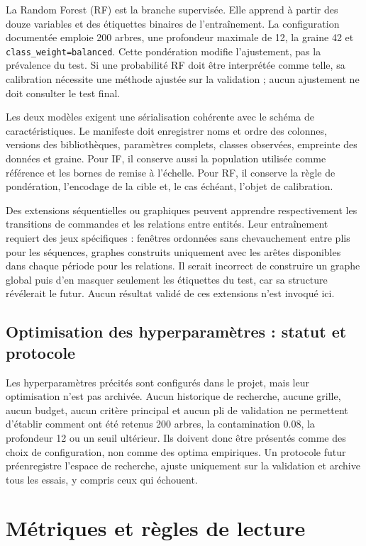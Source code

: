 \documentclass[11pt,a4paper,oneside]{report}
\theoremstyle{definition}
\theoremstyle{plain}
\begin{document}
La Random Forest (RF) est la branche supervisée. Elle apprend à partir des
douze variables et des étiquettes binaires de l'entraînement. La configuration
documentée emploie 200 arbres, une profondeur maximale de 12, la graine 42 et
\texttt{class\_weight=balanced}. Cette pondération modifie l'ajustement, pas la
prévalence du test. Si une probabilité RF doit être interprétée comme telle, sa
calibration nécessite une méthode ajustée sur la validation ; aucun ajustement
ne doit consulter le test final.

Les deux modèles exigent une sérialisation cohérente avec le schéma de
caractéristiques. Le manifeste doit enregistrer noms et ordre des colonnes,
versions des bibliothèques, paramètres complets, classes observées, empreinte
des données et graine. Pour IF, il conserve aussi la population utilisée comme
référence et les bornes de remise à l'échelle. Pour RF, il conserve la règle de
pondération, l'encodage de la cible et, le cas échéant, l'objet de calibration.

Des extensions séquentielles ou graphiques peuvent apprendre respectivement les
transitions de commandes et les relations entre entités. Leur entraînement
requiert des jeux spécifiques : fenêtres ordonnées sans chevauchement entre
plis pour les séquences, graphes construits uniquement avec les arêtes
disponibles dans chaque période pour les relations. Il serait incorrect de
construire un graphe global puis d'en masquer seulement les étiquettes du test,
car sa structure révélerait le futur. Aucun résultat validé de ces extensions
n'est invoqué ici.

\subsection{Optimisation des hyperparamètres : statut et protocole}

Les hyperparamètres précités sont configurés dans le projet, mais leur
optimisation n'est pas archivée. Aucun historique de recherche, aucune grille,
aucun budget, aucun critère principal et aucun pli de validation ne permettent
d'établir comment ont été retenus 200 arbres, la contamination 0.08, la
profondeur 12 ou un seuil ultérieur. Ils doivent donc être présentés comme des
choix de configuration, non comme des optima empiriques. Un protocole futur
préenregistre l'espace de recherche, ajuste uniquement sur la validation et
archive tous les essais, y compris ceux qui échouent.

\section{Métriques et règles de lecture}
\label{sec:eval-metrics}
\end{document}

